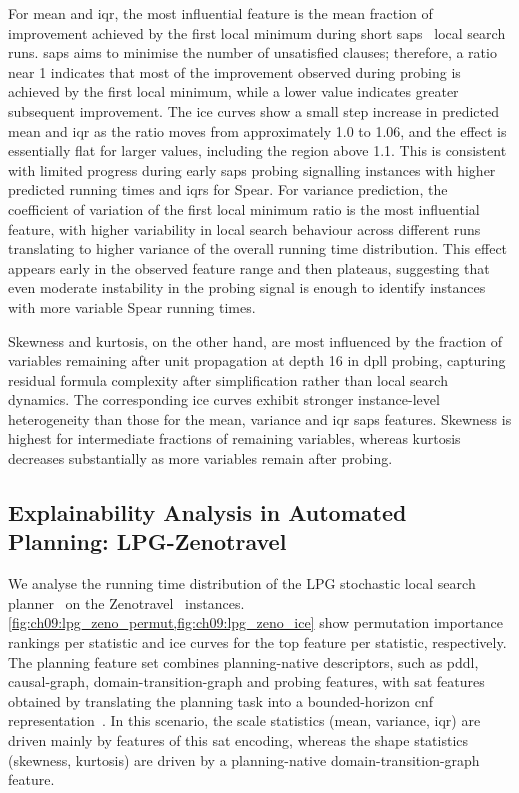 For mean and \gls{iqr}, the most influential feature is the mean fraction of improvement achieved by the first local minimum during short \gls{saps}~\citep{HutEtAl02} local search runs.
\gls{saps} aims to minimise the number of unsatisfied clauses; therefore, a ratio near 1 indicates that most of the improvement observed during probing is achieved by the first local minimum, while a lower value indicates greater subsequent improvement.
The \gls{ice} curves show a small step increase in predicted mean and \gls{iqr} as the ratio moves from approximately 1.0 to 1.06, and the effect is essentially flat for larger values, including the region above 1.1.
This is consistent with limited progress during early \gls{saps} probing signalling instances with higher predicted running times and \glspl{iqr} for Spear.
For variance prediction, the coefficient of variation of the first local minimum ratio is the most influential feature, with higher variability in local search behaviour across different runs translating to higher variance of the overall running time distribution.
This effect appears early in the observed feature range and then plateaus, suggesting that even moderate instability in the probing signal is enough to identify instances with more variable Spear running times.

Skewness and kurtosis, on the other hand, are most influenced by the fraction of variables remaining after unit propagation at depth 16 in \gls{dpll} probing, capturing residual formula complexity after simplification rather than local search dynamics.
The corresponding \gls{ice} curves exhibit stronger instance-level heterogeneity than those for the mean, variance and \gls{iqr} \gls{saps} features.
Skewness is highest for intermediate fractions of remaining variables, whereas kurtosis decreases substantially as more variables remain after probing.

\FloatBarrier

\subsection{Explainability Analysis in Automated Planning: LPG-Zenotravel}
We analyse the running time distribution of the LPG stochastic local search planner~\citep{GerSer02} on the Zenotravel~\citep{PenWel94} instances.
\cref{fig:ch09:lpg_zeno_permut,fig:ch09:lpg_zeno_ice} show permutation importance rankings per statistic and \gls{ice} curves for the top feature per statistic, respectively.
The planning feature set combines planning-native descriptors, such as \gls{pddl}, causal-graph, domain-transition-graph and probing features, with \gls{sat} features obtained by translating the planning task into a bounded-horizon \gls{cnf} representation~\citep{FawEtAl14}.
In this scenario, the scale statistics (mean, variance, \gls{iqr}) are driven mainly by features of this \gls{sat} encoding, whereas the shape statistics (skewness, kurtosis) are driven by a planning-native domain-transition-graph feature.

